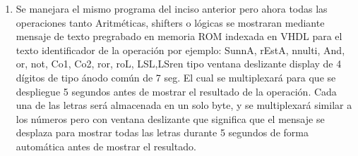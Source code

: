 \begin{enumerate}
\begin{itemize}
			\item Para las opciones de corrimientos de debe incluir un clock para sincronizar los desplazamientos.
			\item Todas las entradas deben ser consideradas dependiendo de la operaci\'on a realizar, estas deber\'an ser introducidas por medio de microswitches.
			\item La asignaci\'on de pines se debe de hacer de acuerdo a la disponibilidad en las terminales de salida en la FPGA.
			\item La salida del bloque aritm\'etico se tendr\'a que ser desplegada en el display de 7 seg. 4 digitos y a su vez la salida de los shifters y la unidad l\'ogica se  mostrara \'unicamente mediante Leds.
		\end{itemize}
		\item Se manejara el mismo programa del inciso anterior pero ahora todas las operaciones tanto Aritm\'eticas,  shifters  o  l\'ogicas se  mostraran mediante mensaje  de  texto  pregrabado  en memoria ROM indexada en VHDL para el texto identificador de la operaci\'on por ejemplo: SunnA,  rEstA,  nnulti,  And, or,  not,  Co1,  Co2,  ror,  roL,  LSL,LSren  tipo  ventana  deslizante display de 4 d\'igitos de tipo \'anodo com\'un de 7 seg. El cual se multiplexar\'a para que se despliegue 5 segundos antes de mostrar el resultado de la operaci\'on. Cada  una  de  las  letras  ser\'a  almacenada  en  un  solo  byte,  y  se  multiplexar\'a similar  a  los n\'umeros pero con ventana deslizante que significa que el mensaje se desplaza para mostrar todas las letras durante 5 segundos de forma autom\'atica antes de mostrar el resultado.
	\end{enumerate}
\clearpage